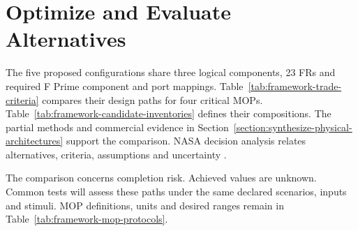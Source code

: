 \section{Optimize and Evaluate Alternatives}
\label{section:optimize-and-evaluate-alternatives}
\label{sec:framework-trade-review}

The five proposed configurations share three logical components, 23 FRs and required F Prime component and port mappings. Table~\ref{tab:framework-trade-criteria} compares their design paths for four critical MOPs. Table~\ref{tab:framework-candidate-inventories} defines their compositions. The partial methods and commercial evidence in Section~\ref{section:synthesize-physical-architectures} support the comparison. NASA decision analysis relates alternatives, criteria, assumptions and uncertainty \citep[Sec.~6.8]{nasa2016systems}.

The comparison concerns completion risk. Achieved values are unknown. Common tests will assess these paths under the same declared scenarios, inputs and stimuli. MOP definitions, units and desired ranges remain in Table~\ref{tab:framework-mop-protocols}.

